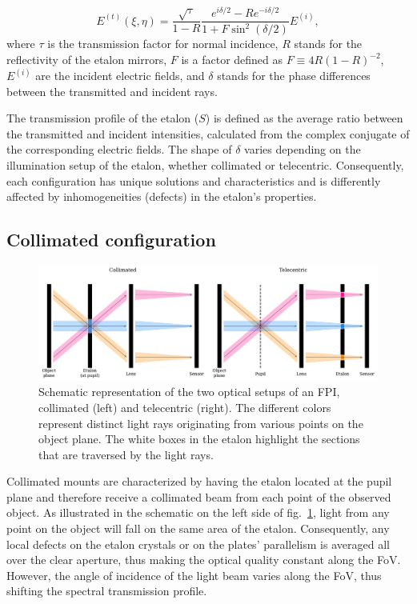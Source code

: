 \begin{equation}
  E ^{(t)}(\xi, \eta) = \frac{\sqrt{\tau}}{1 - R}\frac{e ^{i\delta / 2} - R e ^{ -i\delta / 2}}{1 + F \sin ^2 (\delta / 2)}E ^{(i)},
  \label{eq_etalon_theory: electric_transmitted}
\end{equation}
where $\tau$ is the transmission factor for normal incidence, $R$ stands for the reflectivity of the etalon mirrors, $F$ is a factor defined as $F \equiv 4R (1 - R )^{-2}$, $E^{(i)}$ are the incident electric fields, and $\delta$ stands for the phase differences between the transmitted and incident rays. 

The transmission profile of the etalon ($S$) is defined as the average ratio between the transmitted and incident intensities, calculated from the complex conjugate of the corresponding electric fields. The shape of $\delta$ varies depending on the illumination setup of the etalon, whether collimated or telecentric. Consequently, each configuration has unique solutions and characteristics and is differently affected by inhomogeneities (defects) in the etalon's properties.

\subsection{\label{susec_etalon_theory: collimated}Collimated configuration}

\begin{figure}
  \centering
  \includegraphics[width = \textwidth]{figures/EtalonChallenges/EtalonConfigurations.pdf}
  \caption{Schematic representation of the two optical setups of an FPI, collimated (left) and telecentric (right). The different colors represent distinct light rays originating from various points on the object plane. The white boxes in the etalon highlight the sections that are traversed by the light rays.
  } \label{fig_etalon_theory: Etalon configurations}
\end{figure}

Collimated mounts are characterized by having the etalon located at the pupil plane and therefore receive a collimated beam from each point of the observed object. As illustrated in the schematic on the left side of fig.~{\ref{fig_etalon_theory: Etalon configurations}}, light from any point on the object will fall on the same area of the etalon. Consequently, any local defects on the etalon crystals or on the plates' parallelism is averaged all over the clear aperture, thus making the optical quality constant along the FoV. However, the angle of incidence of the light beam varies along the FoV, thus shifting the spectral transmission profile.  

